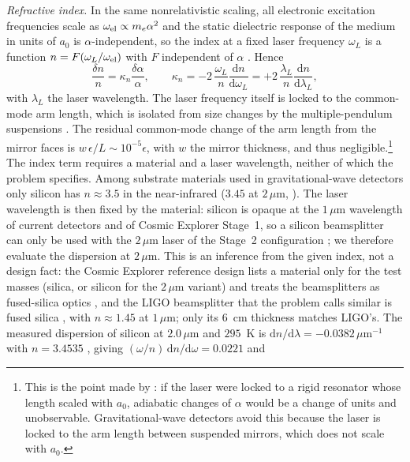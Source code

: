 \emph{Refractive index.} In the same nonrelativistic scaling, all electronic excitation frequencies scale as $\omega_{\rm el}\propto m_e\alpha^2$ and the static dielectric response of the medium in units of $a_0$ is $\alpha$-independent, so the index at a fixed laser frequency $\omega_L$ is a function $n=F(\omega_L/\omega_{\rm el})$ with $F$ independent of $\alpha$ \citep[Eqs.~9 to 13]{GroteStadnik2019}. Hence
\begin{equation}
\frac{\delta n}{n}=\kappa_n\frac{\delta\alpha}{\alpha},\qquad \kappa_n=-2\,\frac{\omega_L}{n}\frac{\mathrm{d}n}{\mathrm{d}\omega_L}=+2\,\frac{\lambda_L}{n}\frac{\mathrm{d}n}{\mathrm{d}\lambda_L},
\label{eq:kappan}
\end{equation}
with $\lambda_L$ the laser wavelength. The laser frequency itself is locked to the common-mode arm length, which is isolated from size changes by the multiple-pendulum suspensions \citep{GroteStadnik2019}. The residual common-mode change of the arm length from the mirror faces is $w\,\epsilon/L\sim10^{-5}\epsilon$, with $w$ the mirror thickness, and thus negligible.\footnote{This is the point made by \citet{StadnikFlambaum2015}: if the laser were locked to a rigid resonator whose length scaled with $a_0$, adiabatic changes of $\alpha$ would be a change of units and unobservable. Gravitational-wave detectors avoid this because the laser is locked to the arm length between suspended mirrors, which does not scale with $a_0$.} The index term requires a material and a laser wavelength, neither of which the problem specifies. Among substrate materials used in gravitational-wave detectors only silicon has $n\approx3.5$ in the near-infrared ($3.45$ at $2\,\mu$m, \citealt{Frey2006}). The laser wavelength is then fixed by the material: silicon is opaque at the $1\,\mu$m wavelength of current detectors and of Cosmic Explorer Stage~1, so a silicon beamsplitter can only be used with the $2\,\mu$m laser of the Stage~2 configuration \citep[Table~1]{Reitze2019}; we therefore evaluate the dispersion at $2\,\mu$m. This is an inference from the given index, not a design fact: the Cosmic Explorer reference design lists a material only for the test masses (silica, or silicon for the $2\,\mu$m variant) and treats the beamsplitters as fused-silica optics \citep[Table~8.1 and Sec.~8.3.2]{Evans2021}, and the LIGO beamsplitter that the problem calls similar is fused silica \citep{GroteStadnik2019}, with $n\approx1.45$ at $1\,\mu$m; only its $6$~cm thickness matches LIGO's. The measured dispersion of silicon at $2.0\,\mu$m and $295$~K is $\mathrm{d}n/\mathrm{d}\lambda=-0.0382\,\mu\mathrm{m}^{-1}$ with $n=3.4535$ \citep{Frey2006}, giving $(\omega/n)\,\mathrm{d}n/\mathrm{d}\omega=0.0221$ and
